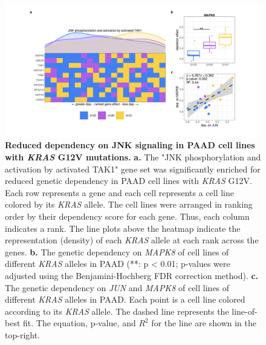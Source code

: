 \documentclass[english, 10pt, letterpaper]{article}
\newcommand{\KRAS}{\emph{KRAS}}
\begin{document}
\begin{figure}[p]
\centering
\includegraphics[width=\textwidth]{figures/SuppFigure_14.jpeg}
\caption{
    \textbf{Reduced dependency on JNK signaling in PAAD cell lines with \KRAS{} G12V mutations.}
    \textbf{a.} The "JNK phosphorylation and activation by activated TAK1" gene set was significantly enriched for reduced genetic dependency in PAAD cell lines with \KRAS{} G12V. Each row represents a gene and each cell represents a cell line colored by its \KRAS{} allele. The cell lines were arranged in ranking order by their dependency score for each gene. Thus, each column indicates a rank. The line plots above the heatmap indicate the representation (density) of each \KRAS{} allele at each rank across the genes.
    \textbf{b.} The genetic dependency on \emph{MAPK8} of cell lines of different \KRAS{} alleles in PAAD (**: p < 0.01; p-values were adjusted using the Benjamini-Hochberg FDR correction method).
    \textbf{c.} The genetic dependency on \emph{JUN} and \emph{MAPK8} of cell lines of different \KRAS{} alleles in PAAD. Each point is a cell line colored according to its \KRAS{} allele. The dashed line represents the line-of-best fit. The equation, p-value, and $R^2$ for the line are shown in the top-right.
}
\label{sfig:paad-dependency-JUN}
\end{figure}

\end{document}
